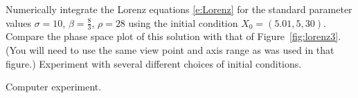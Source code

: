\documentclass{ximera}
\begin{document}
\begin{computerExercise} \label{c11.4.3a}
Numerically integrate the Lorenz equations \eqref{e:Lorenz} for the standard 
parameter values $\sigma=10$, $\beta=\frac{8}{3}$, $\rho=28$ using the initial 
condition $X_0 =(5.01,5,30)$.  Compare the phase space plot of this solution 
with that of Figure~\ref{fig:lorenz3}.  (You will need to use the same view
point and axis range as was used in that figure.)  Experiment with several 
different choices of initial conditions.

\begin{solution}
Computer experiment.

\end{solution}
\end{computerExercise}
\end{document}

